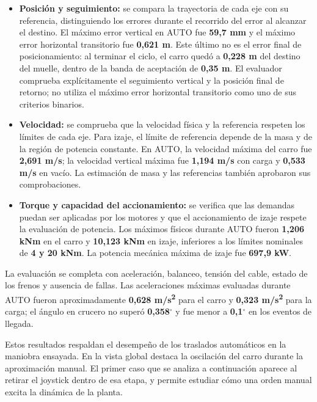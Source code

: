 \documentclass[a4paper,10pt,onecolumn,journal]{ieeeconf}
\numberwithin{equation}{section}
\begin{document}
\begin{itemize}
\item \textbf{Posición y seguimiento:} se compara la trayectoria de cada eje con su referencia, distinguiendo los errores durante el recorrido del error al alcanzar el destino. El máximo error vertical en AUTO fue \textbf{59,7 mm} y el máximo error horizontal transitorio fue \textbf{0,621 m}. Este último no es el error final de posicionamiento: al terminar el ciclo, el carro quedó a \textbf{0,228 m} del destino del muelle, dentro de la banda de aceptación de \textbf{0,35 m}. El evaluador comprueba explícitamente el seguimiento vertical y la posición final de retorno; no utiliza el máximo error horizontal transitorio como uno de sus criterios binarios.
\item \textbf{Velocidad:} se comprueba que la velocidad física y la referencia respeten los límites de cada eje. Para izaje, el límite de referencia depende de la masa y de la región de potencia constante. En AUTO, la velocidad máxima del carro fue \textbf{2,691 m/s}; la velocidad vertical máxima fue \textbf{1,194 m/s} con carga y \textbf{0,533 m/s} en vacío. La estimación de masa y las referencias también aprobaron sus comprobaciones.
\item \textbf{Torque y capacidad del accionamiento:} se verifica que las demandas puedan ser aplicadas por los motores y que el accionamiento de izaje respete la evaluación de potencia. Los máximos físicos durante AUTO fueron \textbf{1,206 kNm} en el carro y \textbf{10,123 kNm} en izaje, inferiores a los límites nominales de \textbf{4 y 20 kNm}. La potencia mecánica máxima de izaje fue \textbf{697,9 kW}.
\end{itemize}

La evaluación se completa con aceleración, balanceo, tensión del cable, estado de los frenos y ausencia de fallas. Las aceleraciones máximas evaluadas durante AUTO fueron aproximadamente \textbf{0,628 m/s\textsuperscript{2}} para el carro y \textbf{0,323 m/s\textsuperscript{2}} para la carga; el ángulo en crucero no superó \textbf{0,358\ensuremath{^{\circ}}} y fue menor a \textbf{0,1\ensuremath{^{\circ}}} en los eventos de llegada.

Estos resultados respaldan el desempeño de los traslados automáticos en la maniobra ensayada. En la vista global destaca la oscilación del carro durante la aproximación manual. El primer caso que se analiza a continuación aparece al retirar el joystick dentro de esa etapa, y permite estudiar cómo una orden manual excita la dinámica de la planta.
\end{document}
